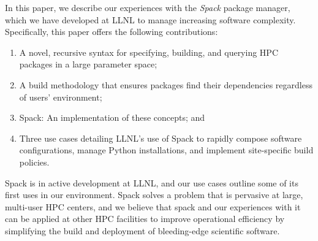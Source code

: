 In this paper, we describe our experiences with the {\it Spack} package manager,
which we have developed at LLNL to manage increasing software complexity.
Specifically, this paper offers the following contributions:
\begin{enumerate}
\item A novel, recursive syntax for specifying, building, and querying
      HPC packages in a large parameter space;
\item A build methodology that ensures packages find their dependencies
      regardless of users' environment; 
\item Spack: An implementation of these concepts; and
\item Three use cases detailing LLNL's use of Spack to rapidly compose
      software configurations, manage Python installations, and implement
      site-specific build policies.
\end{enumerate}

Spack is in active development at LLNL, and our use cases outline some of
its first uses in our environment.  Spack solves a problem that is pervasive
at large, multi-user HPC centers, and we believe that spack and our
experiences with it can be applied at other HPC facilities to improve
operational efficiency by simplifying the build and deployment of 
bleeding-edge scientific software.